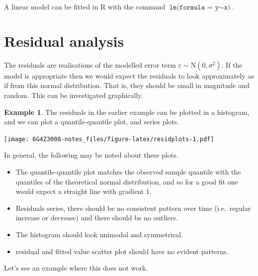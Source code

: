 \documentclass[
]{book}
\theoremstyle{definition}
\theoremstyle{definition}
\newtheorem{example}{Example}[chapter]
\theoremstyle{definition}
\theoremstyle{definition}
\theoremstyle{remark}
\begin{document}
A linear model can be fitted in R with the command \(\texttt{lm(formula = y}\sim\texttt{x)}\).

\hypertarget{residual-analysis}{%
\section{Residual analysis}\label{residual-analysis}}

The residuals are realisations of the modelled error term \(\varepsilon \sim \text{N}(0,\sigma^2)\). If the model is appropriate then we would expect the residuals to look approximately as if from this normal distribution. That is, they should be small in magnitude and random. This can be investigated graphically.

\begin{example}
The residuals in the earlier example can be plotted in a histogram, and we can plot a quantile-quantile plot, and series plots.

\texttt{[image: 6G4Z3008-notes\_files/figure-latex/residplots-1.pdf]}
\end{example}

In general, the following may be noted about these plots.

\begin{itemize}
\item
  The quantile-quantile plot matches the observed sample quantile with the quantiles of the theoretical normal distribution, and so for a good fit one would expect a straight line with gradient \(1\).
\item
  Residuals series, there should be no consistent pattern over time (i.e.~regular increase or decrease) and there should be no outliers.
\item
  The histogram should look unimodal and symmetrical.
\item
  residual and fitted value scatter plot should have no evident patterns.
\end{itemize}

Let's see an example where this does not work.
\end{document}
